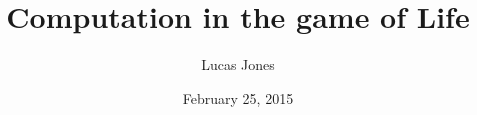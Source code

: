\usepackage{tikz}
\usepackage{graphicx}
\usepackage{pgffor}
\usepackage{xspace}
\usepackage{comment}
\usepackage[rel]{overpic}
\usepackage{hyperref}

\graphicspath{{./figures/} {./patfigs/}}

\newcommand{\theturn}{\arabic{turncnt}}
\newcommand{\imseq}[3]{%
	\foreach \n [count=\sliden] in {#3}{%
		\setcounter{turncnt}{\n}%
		\addtocounter{turncnt}{1}%
		\only<\sliden>{%
		\centering%
		#1%
		\parbox[t][0.6\paperheight][c]{\textwidth}{%
			\begin{center}%
				\texttt{[image: \#2-\\n.eps]}%
			\end{center}
			}%
		}%
	}%
}
\newcommand{\countseq}[3]{\imseq{#1}{#2}{0,...,#3}}
\newcommand{\gametext}{Turn \theturn\\\medskip}
\newcommand{\game}[2]{\countseq{\gametext}{#1}{#2}}
\newcommand{\on}[0]{\textcolor{orange}{\bf 1}\xspace}
\newcommand{\off}[0]{0\xspace}

\newcommand{\qmark}[0]{{\large ?}}
\newcommand{\rqmark}[0]{\textcolor{white}{\qmark}}

\title{Computation in the game of Life}
\author{Lucas Jones}
\date{February 25, 2015}



\maketitle

